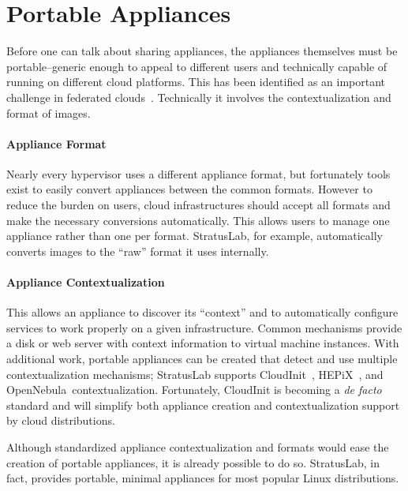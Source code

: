 \section{Portable Appliances}
\label{sec:portable-appliances}

Before one can talk about sharing appliances, the appliances
themselves must be portable--generic enough to appeal to different
users and technically capable of running on different cloud platforms.
This has been identified as an important challenge in federated
clouds~\cite{Petcu}. Technically it involves the contextualization and
format of images.

\paragraph*{Appliance Format}
Nearly every hypervisor uses a different appliance format, but
fortunately tools exist to easily convert appliances between the
common formats.  However to reduce the burden on users, cloud
infrastructures should accept all formats and make the necessary
conversions automatically.  This allows users to manage one appliance
rather than one per format.  StratusLab, for example, automatically
converts images to the ``raw'' format it uses internally. 

\paragraph*{Appliance Contextualization} This allows an appliance to
discover its ``context'' and to automatically configure services to
work properly on a given infrastructure.  Common mechanisms provide a
disk or web server with context information to virtual machine
instances.  With additional work, portable appliances can be created
that detect and use multiple contextualization mechanisms; StratusLab
supports CloudInit~\cite{cloudinit}, HEPiX~\cite{hepixbookcontext},
and OpenNebula~\cite{opennebula}\@ contextualization.  Fortunately, CloudInit is
becoming a {\em de facto} standard and will simplify both appliance
creation and contextualization support by cloud distributions.

Although standardized appliance contextualization and formats would ease
the creation of portable appliances, it is already possible to do so.
StratusLab, in fact, provides portable, minimal appliances for most
popular Linux distributions.
